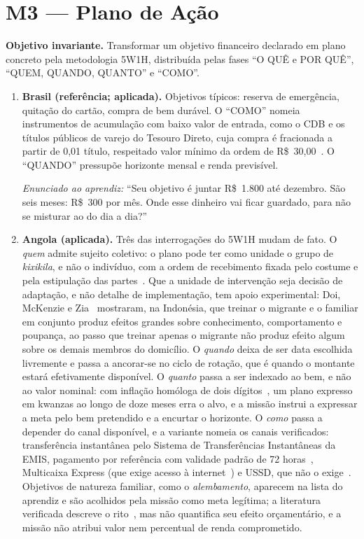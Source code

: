 \section*{M3 --- Plano de Ação}

\noindent\textbf{Objetivo invariante.} Transformar um objetivo financeiro declarado em plano concreto pela metodologia 5W1H, distribuída pelas fases ``O QUÊ e POR QUÊ'', ``QUEM, QUANDO, QUANTO'' e ``COMO''.

\begin{enumerate}
\item[(a)] \textbf{Brasil (referência; aplicada).} Objetivos típicos: reserva de emergência, quitação do cartão, compra de bem durável. O ``COMO'' nomeia instrumentos de acumulação com baixo valor de entrada, como o CDB e os títulos públicos de varejo do Tesouro Direto, cuja compra é fracionada a partir de 0,01 título, respeitado valor mínimo da ordem de R\$~30,00~\cite{tesourodireto}. O ``QUANDO'' pressupõe horizonte mensal e renda previsível.

\noindent\textit{Enunciado ao aprendiz:} ``Seu objetivo é juntar R\$~1.800 até dezembro. São seis meses: R\$~300 por mês. Onde esse dinheiro vai ficar guardado, para não se misturar ao do dia a dia?''

\item[(b)] \textbf{Angola (aplicada).} Três das interrogações do 5W1H mudam de fato. O \emph{quem} admite sujeito coletivo: o plano pode ter como unidade o grupo de \textit{kixikila}, e não o indivíduo, com a ordem de recebimento fixada pelo costume e pela estipulação das partes~\cite{carlos2014kixikila}. Que a unidade de intervenção seja decisão de adaptação, e não detalhe de implementação, tem apoio experimental: Doi, McKenzie e Zia~\cite{doi2014} mostraram, na Indonésia, que treinar o migrante e o familiar em conjunto produz efeitos grandes sobre conhecimento, comportamento e poupança, ao passo que treinar apenas o migrante não produz efeito algum sobre os demais membros do domicílio. O \emph{quando} deixa de ser data escolhida livremente e passa a ancorar-se no ciclo de rotação, que é quando o montante estará efetivamente disponível. O \emph{quanto} passa a ser indexado ao bem, e não ao valor nominal: com inflação homóloga de dois dígitos~\cite{ineangola2026ipcn}, um plano expresso em kwanzas ao longo de doze meses erra o alvo, e a missão instrui a expressar a meta pelo bem pretendido e a encurtar o horizonte. O \emph{como} passa a depender do canal disponível, e a variante nomeia os canais verificados: transferência instantânea pelo Sistema de Transferências Instantâneas da EMIS, pagamento por referência com validade padrão de 72 horas~\cite{appypay2026referencia}, Multicaixa Express (que exige acesso à internet~\cite{multicaixa2026faq}) e USSD, que não o exige~\cite{accessbank2026ussd,atlantico2026ussd}. Objetivos de natureza familiar, como o \textit{alembamento}, aparecem na lista do aprendiz e são acolhidos pela missão como meta legítima; a literatura verificada descreve o rito~\cite{quijila2024alembamento}, mas não quantifica seu efeito orçamentário, e a missão não atribui valor nem percentual de renda comprometido.


\end{enumerate}

